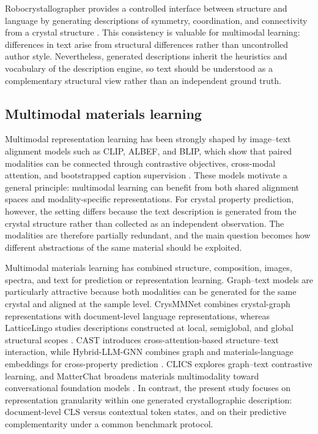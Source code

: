\documentclass[a4paper,fleqn]{cas-sc}
\begin{document}
Robocrystallographer provides a controlled interface between structure and language by generating descriptions of symmetry, coordination, and connectivity from a crystal structure \citep{ganose2019robocrystallographer}. This consistency is valuable for multimodal learning: differences in text arise from structural differences rather than uncontrolled author style. Nevertheless, generated descriptions inherit the heuristics and vocabulary of the description engine, so text should be understood as a complementary structural view rather than an independent ground truth.

\subsection{Multimodal materials learning}
Multimodal representation learning has been strongly shaped by image--text alignment models such as CLIP, ALBEF, and BLIP, which show that paired modalities can be connected through contrastive objectives, cross-modal attention, and bootstrapped caption supervision \citep{radford2021clip,li2021albef,li2022blip}. These models motivate a general principle: multimodal learning can benefit from both shared alignment spaces and modality-specific representations. For crystal property prediction, however, the setting differs because the text description is generated from the crystal structure rather than collected as an independent observation. The modalities are therefore partially redundant, and the main question becomes how different abstractions of the same material should be exploited.

Multimodal materials learning has combined structure, composition, images, spectra, and text for prediction or representation learning. Graph--text models are particularly attractive because both modalities can be generated for the same crystal and aligned at the sample level. CrysMMNet combines crystal-graph representations with document-level language representations, whereas LatticeLingo studies descriptions constructed at local, semiglobal, and global structural scopes \citep{das2023crysmmnet,munjal2024latticelingo}. CAST introduces cross-attention-based structure--text interaction, while Hybrid-LLM-GNN combines graph and materials-language embeddings for cross-property prediction \citep{lee2025cast,li2025hybridllmgnn}. CLICS explores graph--text contrastive learning, and MatterChat broadens materials multimodality toward conversational foundation models \citep{ozawa2024clics,tang2025matterchat}. In contrast, the present study focuses on representation granularity within one generated crystallographic description: document-level CLS versus contextual token states, and on their predictive complementarity under a common benchmark protocol.
\end{document}
